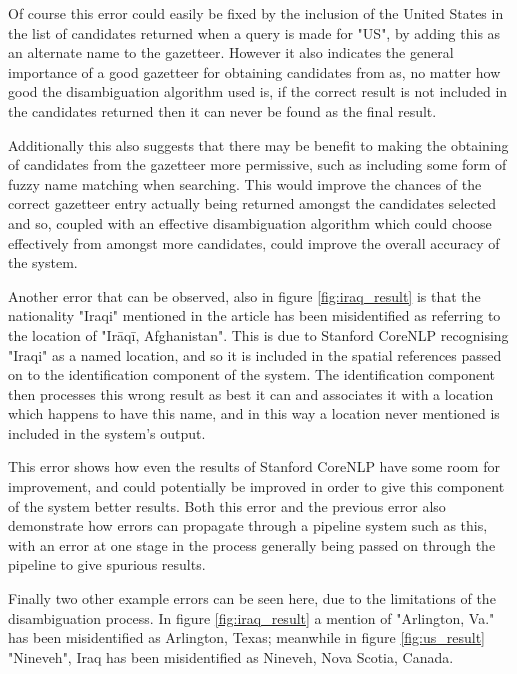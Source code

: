 \documentclass[12pt, a4paper]{report}
\begin{document}
Of course this error could easily be fixed by the inclusion of the United States in the list of candidates returned when a query is made for "US", by adding this as an alternate name to the gazetteer. However it also indicates the general importance of a good gazetteer for obtaining candidates from as, no matter how good the disambiguation algorithm used is, if the correct result is not included in the candidates returned then it can never be found as the final result.

Additionally this also suggests that there may be benefit to making the obtaining of candidates from the gazetteer more permissive, such as including some form of fuzzy name matching when searching. This would improve the chances of the correct gazetteer entry actually being returned amongst the candidates selected and so, coupled with an effective disambiguation algorithm which could choose effectively from amongst more candidates, could improve the overall accuracy of the system.

 


Another error that can be observed, also in figure \ref{fig:iraq_result} is that the nationality "Iraqi" mentioned in the article has been misidentified as referring to the location of "Irāqī, Afghanistan". This is due to Stanford CoreNLP recognising "Iraqi" as a named location, and so it is included in the spatial references passed on to the identification component of the system. The identification component then processes this wrong result as best it can and associates it with a location which happens to have this name, and in this way a location never mentioned is included in the system's output.

This error shows how even the results of Stanford CoreNLP have some room for improvement, and could potentially be improved in order to give this component of the system better results. Both this error and the previous error also demonstrate how errors can propagate through a pipeline system such as this, with an error at one stage in the process generally being passed on through the pipeline to give spurious results.

Finally two other example errors can be seen here, due to the limitations of the disambiguation process. In figure \ref{fig:iraq_result} a mention of "Arlington, Va." has been misidentified as Arlington, Texas; meanwhile in figure \ref{fig:us_result} "Nineveh", Iraq has been misidentified as Nineveh, Nova Scotia, Canada.
\end{document}
